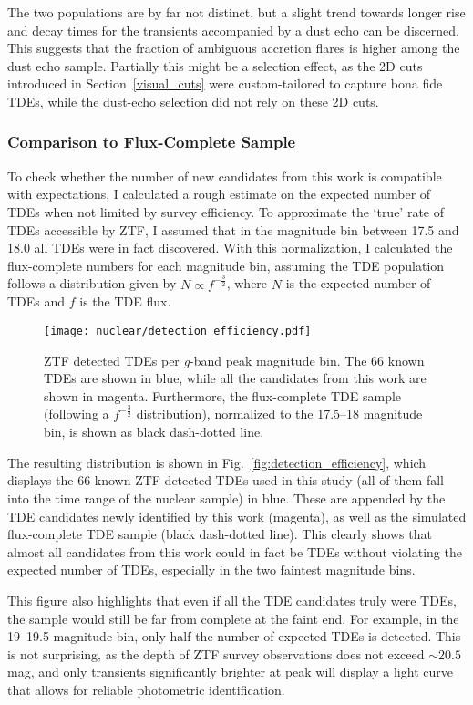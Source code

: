 The two populations are by far not distinct, but a slight trend towards longer rise and decay times for the transients accompanied by a dust echo can be discerned. This suggests that the fraction of ambiguous accretion flares is higher among the dust echo sample. Partially this might be a selection effect, as the 2D cuts introduced in Section~\ref{visual_cuts} were custom-tailored to capture bona fide TDEs, while the dust-echo selection did not rely on these 2D cuts.

\subsubsection{Comparison to Flux-Complete Sample}
To check whether the number of new candidates from this work is compatible with expectations, I calculated a rough estimate on the expected number of TDEs when not limited by survey efficiency. To approximate the `true' rate of TDEs accessible by ZTF, I assumed that in the magnitude bin between 17.5 and 18.0 all TDEs were in fact discovered. With this normalization, I calculated the flux-complete numbers for each magnitude bin, assuming the TDE population follows a distribution given by $N\propto f^{-\frac{3}{2}}$, where $N$ is the expected number of TDEs and $f$ is the TDE flux.

\begin{figure}[htb]
  \texttt{[image: nuclear/detection\_efficiency.pdf]}
  \caption[ZTF TDE detections per magnitude bin]{ZTF detected TDEs per \textit{g}-band peak magnitude bin. The 66 known TDEs are shown in blue, while all the candidates from this work are shown in magenta. Furthermore, the flux-complete TDE sample (following a $f^{-\frac{3}{2}}$ distribution), normalized to the 17.5--18 magnitude bin, is shown as black dash-dotted line.}
\end{figure}

The resulting distribution is shown in Fig.~\ref{fig:detection_efficiency}, which displays the 66 known ZTF-detected TDEs used in this study (all of them fall into the time range of the nuclear sample) in blue. These are appended by the TDE candidates newly identified by this work (magenta), as well as the simulated flux-complete TDE sample (black dash-dotted line). This clearly shows that almost all candidates from this work could in fact be TDEs without violating the expected number of TDEs, especially in the two faintest magnitude bins.

This figure also highlights that even if all the TDE candidates truly were TDEs, the sample would still be far from complete at the faint end. For example, in the 19--19.5 magnitude bin, only half the number of expected TDEs is detected. This is not surprising, as the depth of ZTF survey observations does not exceed $\sim 20.5$ mag, and only transients significantly brighter at peak will display a light curve that allows for reliable photometric identification.

